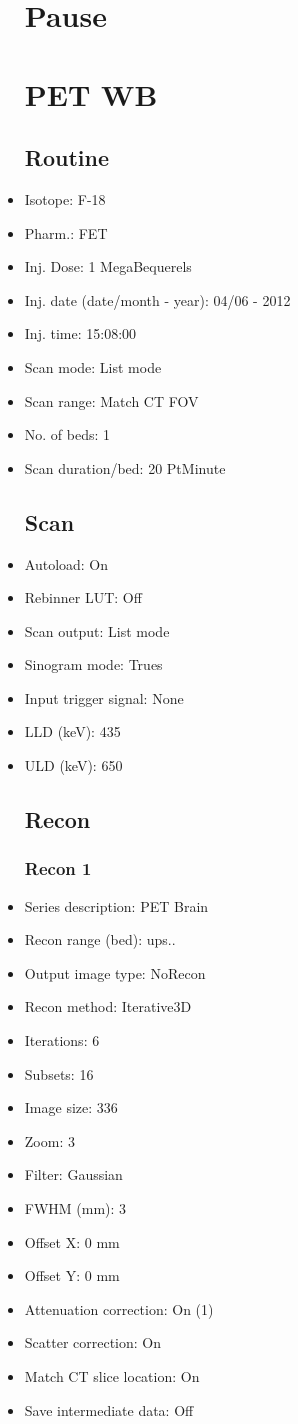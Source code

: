 \documentclass[12pt]{article}
\begin{document}
\begin{itemize}
\section{Pause}

\section{PET WB}
\subsection{Routine}
\item Isotope: F-18
\item Pharm.: FET
\item Inj. Dose: 1 MegaBequerels
\item Inj. date (date/month - year): 04/06 - 2012
\item Inj. time: 15:08:00
\item Scan mode: List mode
\item Scan range: Match CT FOV
\item No. of beds: 1
\item Scan duration/bed: 20 PtMinute
\subsection{Scan}
\item Autoload: On
\item Rebinner LUT: Off
\item Scan output: List mode
\item Sinogram mode: Trues
\item Input trigger signal: None
\item LLD (keV): 435
\item ULD (keV): 650
\subsection{Recon}

\subsubsection{Recon 1}
\item Series description: PET Brain
\item Recon range (bed): ups..
\item Output image type: NoRecon
\item Recon method: Iterative3D
\item Iterations: 6
\item Subsets: 16
\item Image size: 336
\item Zoom: 3
\item Filter: Gaussian
\item FWHM (mm): 3
\item Offset X: 0 mm
\item Offset Y: 0 mm
\item Attenuation correction: On (1)
\item Scatter correction: On
\item Match CT slice location: On
\item Save intermediate data: Off
\end{itemize}
\end{document}
